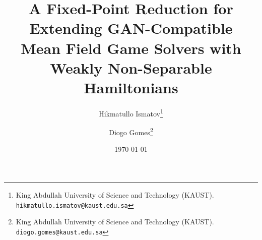 \documentclass[12pt]{article}
\title{\textbf{A Fixed-Point Reduction for Extending GAN-Compatible\\
Mean Field Game Solvers with Weakly Non-Separable Hamiltonians}}
\author{
  Hikmatullo Ismatov\thanks{King Abdullah University of Science and Technology (KAUST). \texttt{hikmatullo.ismatov@kaust.edu.sa}} \and
  Diogo Gomes\thanks{King Abdullah University of Science and Technology (KAUST). \texttt{diogo.gomes@kaust.edu.sa}}
}
\date{\today}
\begin{document}
\maketitle

\begin{abstract}
  
\end{abstract}

\newpage
\tableofcontents
\newpage













\appendix

\end{document}
